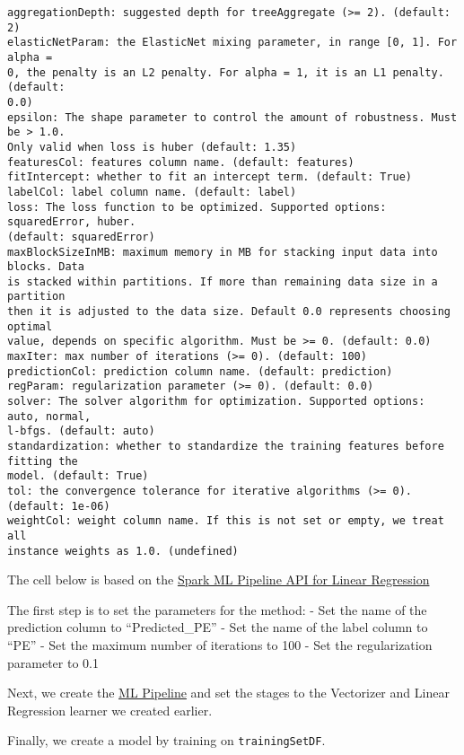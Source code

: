 \documentclass[11pt]{article}
\begin{document}
    \begin{Verbatim}[commandchars=\\\{\}]
aggregationDepth: suggested depth for treeAggregate (>= 2). (default: 2)
elasticNetParam: the ElasticNet mixing parameter, in range [0, 1]. For alpha =
0, the penalty is an L2 penalty. For alpha = 1, it is an L1 penalty. (default:
0.0)
epsilon: The shape parameter to control the amount of robustness. Must be > 1.0.
Only valid when loss is huber (default: 1.35)
featuresCol: features column name. (default: features)
fitIntercept: whether to fit an intercept term. (default: True)
labelCol: label column name. (default: label)
loss: The loss function to be optimized. Supported options: squaredError, huber.
(default: squaredError)
maxBlockSizeInMB: maximum memory in MB for stacking input data into blocks. Data
is stacked within partitions. If more than remaining data size in a partition
then it is adjusted to the data size. Default 0.0 represents choosing optimal
value, depends on specific algorithm. Must be >= 0. (default: 0.0)
maxIter: max number of iterations (>= 0). (default: 100)
predictionCol: prediction column name. (default: prediction)
regParam: regularization parameter (>= 0). (default: 0.0)
solver: The solver algorithm for optimization. Supported options: auto, normal,
l-bfgs. (default: auto)
standardization: whether to standardize the training features before fitting the
model. (default: True)
tol: the convergence tolerance for iterative algorithms (>= 0). (default: 1e-06)
weightCol: weight column name. If this is not set or empty, we treat all
instance weights as 1.0. (undefined)
    \end{Verbatim}

    The cell below is based on the
\href{https://spark.apache.org/docs/latest/api/python/reference/api/pyspark.ml.regression.LinearRegression.html?highlight=linearregression\#pyspark.ml.regression.LinearRegression}{Spark
ML Pipeline API for Linear Regression}

The first step is to set the parameters for the method: - Set the name
of the prediction column to ``Predicted\_PE'' - Set the name of the
label column to ``PE'' - Set the maximum number of iterations to 100 -
Set the regularization parameter to 0.1

Next, we create the
\href{https://spark.apache.org/docs/latest/api/python/reference/api/pyspark.ml.Pipeline.html}{ML
Pipeline} and set the stages to the Vectorizer and Linear Regression
learner we created earlier.

Finally, we create a model by training on \texttt{trainingSetDF}.
\end{document}
